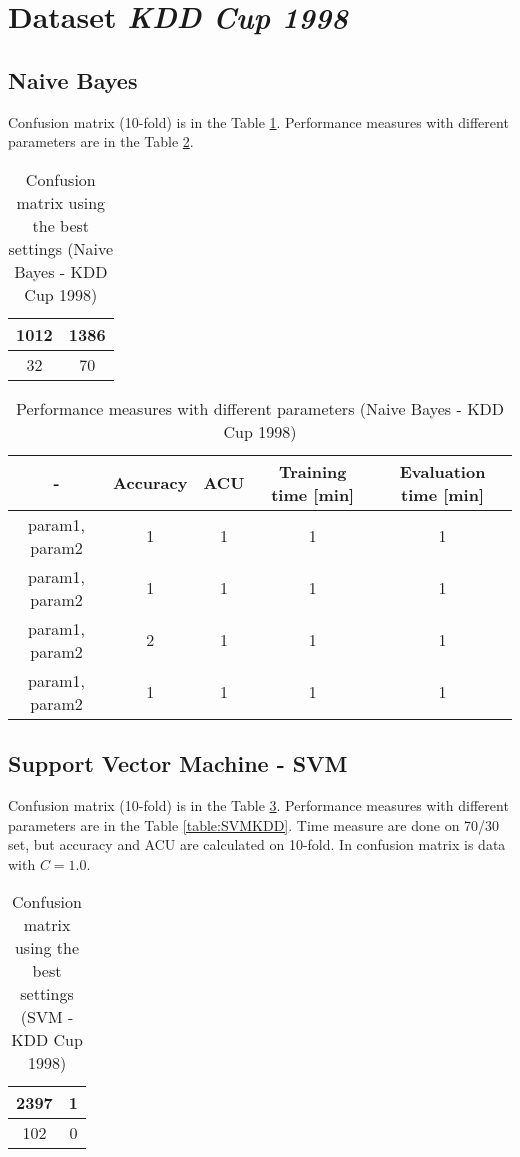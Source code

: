 \documentclass[11pt,a4paper,titlepage]{article}
\begin{document}
\section{Dataset \textit{KDD Cup 1998}}

\subsection{Naive Bayes}
Confusion matrix (10-fold) is in the Table \ref{table:confusionMatrixBayesKDD}. Performance measures with different parameters are in the Table \ref{table:BayesKDD}.
\begin{table}
  \centering
  \begin{tabular}{| c | c |}
    \hline
    1012 & 1386 \\ \hline
    32 & 70 \\
    \hline
  \end{tabular}
  \caption{Confusion matrix using the best settings (Naive Bayes - KDD Cup 1998)}
  \label{table:confusionMatrixBayesKDD}
  \end{table}
  
  \begin{table}
  \centering
  \begin{tabular}{| c | c | c | c | c |}
    \hline
     		-	   & Accuracy & 	ACU 	& Training time [min] & Evaluation time [min] \\ \hline
    param1, param2 &  1 	  &     1		& 		1			  & 		1 		\\ \hline
    param1, param2 & 	1	  & 	1 		& 		1			  &			1 		\\ \hline
    param1, param2 & 	2	  & 	1		& 		1			  &			1		\\ \hline
    param1, param2 &  1       & 	1		& 		1			  &			1			\\
    \hline
  \end{tabular}
  \caption{Performance measures with different parameters (Naive Bayes - KDD Cup 1998)}
  \label{table:BayesKDD}
  \end{table}
  
\subsection{Support Vector Machine - SVM}

Confusion matrix (10-fold) is in the Table \ref{table:confusionMatrixSVMKDD}. Performance measures with different parameters are in the Table \ref{table:SVMKDD}. Time measure are done on 70/30 set, but accuracy and ACU are calculated on 10-fold. In confusion matrix is data with $C = 1.0$.
\begin{table}
  \centering
  \begin{tabular}{| c | c |}
    \hline
   		2397 & 1 \\ \hline
    	102 & 0\\
    \hline
  \end{tabular}
  \caption{Confusion matrix using the best settings (SVM - KDD Cup 1998)}
  \label{table:confusionMatrixSVMKDD}
  \end{table}
  
\end{document}
